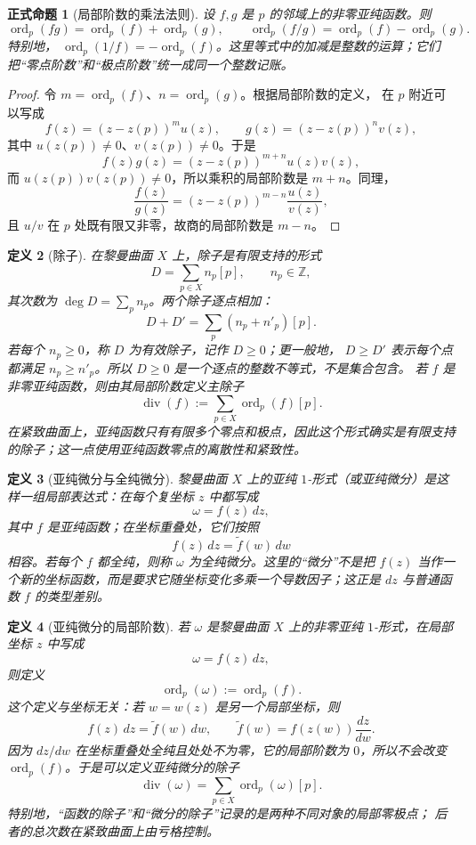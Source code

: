 \documentclass[UTF8,fontset=none,a4paper,11pt]{ctexart}
\theoremstyle{foundation-definition}
\newtheorem{definition}{定义}[section]
\theoremstyle{foundation-theorem}
\theoremstyle{foundation-proposition}
\newtheorem{proposition}[definition]{正式命题}
\theoremstyle{foundation-example}
\theoremstyle{foundation-remark}
\theoremstyle{foundation-theorem}
\begin{document}
\begin{proposition}[局部阶数的乘法法则]\label{prop:order-additivity}
设 \(f,g\) 是 \(p\) 的邻域上的非零亚纯函数。则
\[
\operatorname{ord}_p(fg)=\operatorname{ord}_p(f)+\operatorname{ord}_p(g),
\qquad
\operatorname{ord}_p(f/g)=\operatorname{ord}_p(f)-\operatorname{ord}_p(g).
\]
特别地，
\(
\operatorname{ord}_p(1/f)=-\operatorname{ord}_p(f)
\)。这里等式中的加减是整数的运算；它们把“零点阶数”和“极点阶数”统一成同一个整数记账。
\end{proposition}

\begin{proof}
令 \(m=\operatorname{ord}_p(f)\)、\(n=\operatorname{ord}_p(g)\)。根据局部阶数的定义，
在 \(p\) 附近可以写成
\[
f(z)=(z-z(p))^m u(z),\qquad
g(z)=(z-z(p))^n v(z),
\]
其中 \(u(z(p))\neq0\)、\(v(z(p))\neq0\)。于是
\[
f(z)g(z)=(z-z(p))^{m+n}u(z)v(z),
\]
而 \(u(z(p))v(z(p))\neq0\)，所以乘积的局部阶数是 \(m+n\)。同理，
\[
\frac{f(z)}{g(z)}=(z-z(p))^{m-n}\frac{u(z)}{v(z)},
\]
且 \(u/v\) 在 \(p\) 处既有限又非零，故商的局部阶数是 \(m-n\)。
\end{proof}

\begin{definition}[除子]\label{def:divisor}
在黎曼曲面 \(X\) 上，除子是有限支持的形式
\[
D=\sum_{p\in X}n_p[p],\qquad n_p\in\mathbb Z,
\]
其次数为 \(\deg D=\sum_pn_p\)。两个除子逐点相加：
\[
D+D'=\sum_p(n_p+n'_p)[p].
\]
若每个 \(n_p\geq0\)，称 \(D\) 为有效除子，记作 \(D\geq0\)；更一般地，
\(D\geq D'\) 表示每个点都满足 \(n_p\geq n'_p\)。所以 \(D\geq0\) 是一个逐点的整数不等式，不是集合包含。
若 \(f\) 是非零亚纯函数，则由其局部阶数定义主除子
\[
\operatorname{div}(f):=\sum_{p\in X}\operatorname{ord}_p(f)[p].
\]
在紧致曲面上，亚纯函数只有有限多个零点和极点，因此这个形式确实是有限支持的除子；这一点使用亚纯函数零点的离散性和紧致性。
\end{definition}

\begin{definition}[亚纯微分与全纯微分]\label{def:meromorphic-differential}
黎曼曲面 \(X\) 上的亚纯 \(1\)-形式（或亚纯微分）是这样一组局部表达式：在每个复坐标
\(z\) 中都写成
\[
\omega=f(z)\,dz,
\]
其中 \(f\) 是亚纯函数；在坐标重叠处，它们按照
\[
f(z)\,dz=\widetilde f(w)\,dw
\]
相容。若每个 \(f\) 都全纯，则称 \(\omega\) 为全纯微分。这里的“微分”不是把
\(f(z)\) 当作一个新的坐标函数，而是要求它随坐标变化多乘一个导数因子；这正是
\(dz\) 与普通函数 \(f\) 的类型差别。
\end{definition}

\begin{definition}[亚纯微分的局部阶数]\label{def:order-differential}
若 \(\omega\) 是黎曼曲面 \(X\) 上的非零亚纯 \(1\)-形式，在局部坐标 \(z\) 中写成
\[
\omega=f(z)\,dz,
\]
则定义
\[
\operatorname{ord}_p(\omega):=\operatorname{ord}_p(f).
\]
这个定义与坐标无关：若 \(w=w(z)\) 是另一个局部坐标，则
\[
f(z)\,dz=\widetilde f(w)\,dw,\qquad
\widetilde f(w)=f(z(w))\frac{dz}{dw}.
\]
因为 \(dz/dw\) 在坐标重叠处全纯且处处不为零，它的局部阶数为 \(0\)，所以不会改变
\(\operatorname{ord}_p(f)\)。于是可以定义亚纯微分的除子
\[
\operatorname{div}(\omega)=\sum_{p\in X}\operatorname{ord}_p(\omega)[p].
\]
特别地，“函数的除子”和“微分的除子”记录的是两种不同对象的局部零极点；
后者的总次数在紧致曲面上由亏格控制。
\end{definition}
\end{document}

